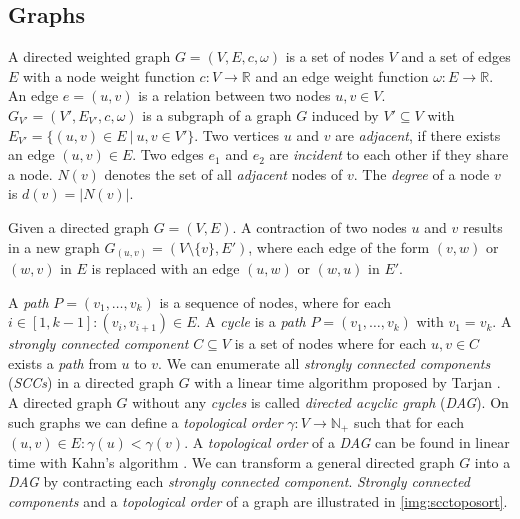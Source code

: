 \subsection{Graphs}
%
A directed weighted graph $G = (V,E,c,\omega)$ is a set of nodes $V$ 
and a set of edges $E$ with a node weight function 
$c: V \rightarrow \mathbb{R}$ and an edge weight 
function $\omega: E \rightarrow \mathbb{R}$. An edge $e = (u,v)$ 
is a relation between two nodes $u,v \in V$.
$G_{V'} = (V',E_{V'},c,\omega)$ is a subgraph of a graph $G$
induced by $V' \subseteq V$ with $E_{V'} = \{(u,v) \in E\ |\ u,v \in V'\}$.
Two vertices $u$ and $v$ are \emph{adjacent}, if there exists an edge
$(u,v) \in E$. Two edges $e_1$ and $e_2$ are \emph{incident} to each other if they
share a node. $N(v)$ denotes the set of all \emph{adjacent} nodes of 
$v$. The \emph{degree} of a node $v$ is $d(v) = |N(v)|$.

\begin{definition}[Contraction]
Given a directed graph $G = (V,E)$. A contraction of two nodes
$u$ and $v$ results in a new graph $G_{(u,v)} = (V\setminus\{v\},E')$, where
each edge of the form $(v,w)$ or $(w,v)$ in $E$ is replaced with an edge 
$(u,w)$ or $(w,u)$ in $E'$.
\label{def:contraction}
\end{definition}

A \emph{path} $P = (v_1,\ldots,v_k)$ is a sequence of nodes, where for
each $i \in [1,k-1]: (v_i,v_{i+1}) \in E$. A \emph{cycle} is a \emph{path}
$P = (v_1,\ldots,v_k)$ with $v_1 = v_k$. A \emph{strongly connected 
component} $C \subseteq V$ is a set of nodes where for each $u,v \in C$
exists a \emph{path} from $u$ to $v$. We can enumerate all \emph{strongly
connected components} (\emph{SCCs}) in a directed graph $G$ with a linear time algorithm
proposed by Tarjan \cite{tarjan1972depth}. A directed graph $G$ without
any \emph{cycles} is called \emph{directed acyclic graph} (\emph{DAG}). On such
graphs we can define a \emph{topological order} $\gamma: V \rightarrow \mathbb{N}_+$ such
that for each $(u,v) \in E: \gamma(u) < \gamma(v)$. A \emph{topological order}
of a \emph{DAG} can be found in linear time with Kahn's algorithm \cite{kahn1962topological}.
We can transform a general directed graph $G$ into a \emph{DAG} by contracting
each \emph{strongly connected component}. \emph{Strongly connected components}
and a \emph{topological order} of a graph are illustrated in \autoref{img:scctoposort}.

